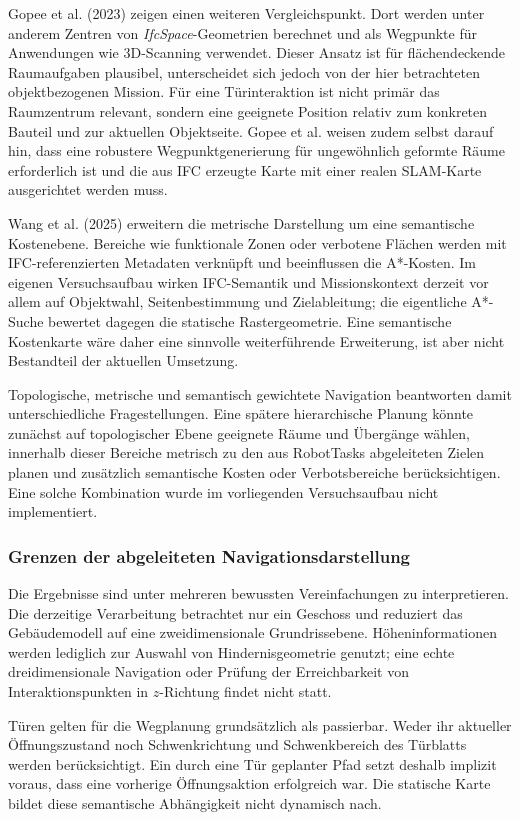 Gopee et al. (2023) zeigen einen weiteren Vergleichspunkt. Dort werden unter anderem Zentren von
\textit{IfcSpace}-Geometrien berechnet und als Wegpunkte für Anwendungen wie 3D-Scanning verwendet.
Dieser Ansatz ist für flächendeckende Raumaufgaben plausibel, unterscheidet sich jedoch von der hier
betrachteten objektbezogenen Mission. Für eine Türinteraktion ist nicht primär das Raumzentrum
relevant, sondern eine geeignete Position relativ zum konkreten Bauteil und zur aktuellen
Objektseite. Gopee et al. weisen zudem selbst darauf hin, dass eine robustere Wegpunktgenerierung
für ungewöhnlich geformte Räume erforderlich ist und die aus IFC erzeugte Karte mit einer realen
SLAM-Karte ausgerichtet werden muss.

Wang et al. (2025) erweitern die metrische Darstellung um eine semantische Kostenebene. Bereiche wie
funktionale Zonen oder verbotene Flächen werden mit IFC-referenzierten Metadaten verknüpft und
beeinflussen die A*-Kosten. Im eigenen Versuchsaufbau wirken IFC-Semantik und Missionskontext
derzeit vor allem auf Objektwahl, Seitenbestimmung und Zielableitung; die eigentliche A*-Suche
bewertet dagegen die statische Rastergeometrie. Eine semantische Kostenkarte wäre daher eine
sinnvolle weiterführende Erweiterung, ist aber nicht Bestandteil der aktuellen Umsetzung.

Topologische, metrische und semantisch gewichtete Navigation beantworten damit unterschiedliche
Fragestellungen. Eine spätere hierarchische Planung könnte zunächst auf topologischer Ebene
geeignete Räume und Übergänge wählen, innerhalb dieser Bereiche metrisch zu den aus RobotTasks
abgeleiteten Zielen planen und zusätzlich semantische Kosten oder Verbotsbereiche berücksichtigen.
Eine solche Kombination wurde im vorliegenden Versuchsaufbau nicht implementiert.

\subsubsection{Grenzen der abgeleiteten Navigationsdarstellung}
Die Ergebnisse sind unter mehreren bewussten Vereinfachungen zu interpretieren. Die derzeitige
Verarbeitung betrachtet nur ein Geschoss und reduziert das Gebäudemodell auf eine zweidimensionale
Grundrissebene. Höheninformationen werden lediglich zur Auswahl von Hindernisgeometrie genutzt; eine
echte dreidimensionale Navigation oder Prüfung der Erreichbarkeit von Interaktionspunkten in
\(z\)-Richtung findet nicht statt.

Türen gelten für die Wegplanung grundsätzlich als passierbar. Weder ihr aktueller Öffnungszustand
noch Schwenkrichtung und Schwenkbereich des Türblatts werden berücksichtigt. Ein durch eine Tür
geplanter Pfad setzt deshalb implizit voraus, dass eine vorherige Öffnungsaktion erfolgreich war.
Die statische Karte bildet diese semantische Abhängigkeit nicht dynamisch nach.

